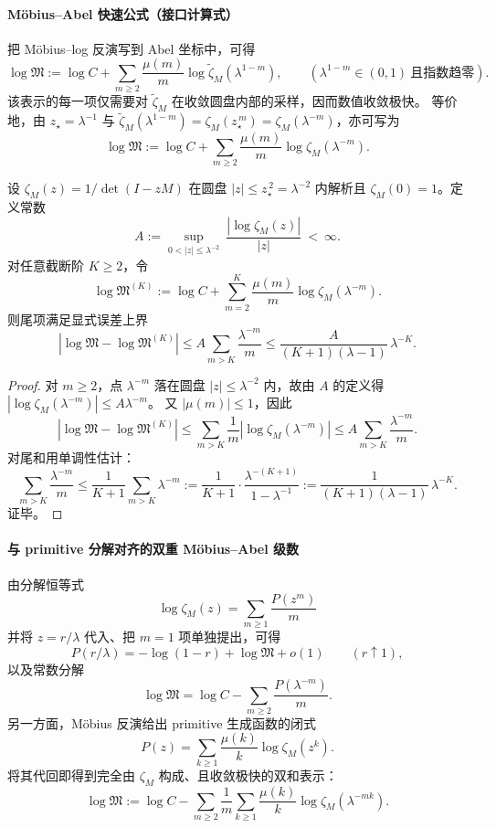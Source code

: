 \paragraph{Möbius--Abel 快速公式（接口计算式）}
把 Möbius--log 反演写到 Abel 坐标中，可得
\[
\log\mathfrak{M}
:=\log C+\sum_{m\ge 2}\frac{\mu(m)}{m}\log\widetilde{\zeta}_M(\lambda^{1-m}),
\qquad (\lambda^{1-m}\in(0,1)\ \text{且指数趋零}).
\]
该表示的每一项仅需要对 $\widetilde{\zeta}_M$ 在收敛圆盘内部的采样，因而数值收敛极快。
等价地，由 $z_\star=\lambda^{-1}$ 与 $\widetilde{\zeta}_M(\lambda^{1-m})=\zeta_M(z_\star^{\,m})=\zeta_M(\lambda^{-m})$，亦可写为
\[
\log\mathfrak{M}
:=\log C+\sum_{m\ge 2}\frac{\mu(m)}{m}\log\zeta_M(\lambda^{-m}).
\]

\begin{proposition}\label{prop:real-input-40-logM-trunc-bound}
设 $\zeta_M(z)=1/\det(I-zM)$ 在圆盘 $|z|\le z_\star^{\,2}=\lambda^{-2}$ 内解析且 $\zeta_M(0)=1$。定义常数
\[
A:=\sup_{0<|z|\le \lambda^{-2}}\ \frac{|\log\zeta_M(z)|}{|z|}\ <\ \infty.
\]
对任意截断阶 $K\ge 2$，令
\[
\log\mathfrak{M}^{(K)}:=\log C+\sum_{m=2}^{K}\frac{\mu(m)}{m}\log\zeta_M(\lambda^{-m}).
\]
则尾项满足显式误差上界
\[
\boxed{\;
|\log\mathfrak{M}-\log\mathfrak{M}^{(K)}|
\le
A\sum_{m>K}\frac{\lambda^{-m}}{m}
\le
\frac{A}{(K+1)(\lambda-1)}\,\lambda^{-K}.
\;}
\]
\end{proposition}
\begin{proof}
对 $m\ge 2$，点 $\lambda^{-m}$ 落在圆盘 $|z|\le\lambda^{-2}$ 内，故由 $A$ 的定义得
\(
|\log\zeta_M(\lambda^{-m})|\le A\lambda^{-m}
\)。
又 $|\mu(m)|\le 1$，因此
\[
|\log\mathfrak{M}-\log\mathfrak{M}^{(K)}|
\le \sum_{m>K}\frac{1}{m}|\log\zeta_M(\lambda^{-m})|
\le A\sum_{m>K}\frac{\lambda^{-m}}{m}.
\]
对尾和用单调性估计：
\[
\sum_{m>K}\frac{\lambda^{-m}}{m}
\le
\frac{1}{K+1}\sum_{m>K}\lambda^{-m}
:=\frac{1}{K+1}\cdot\frac{\lambda^{-(K+1)}}{1-\lambda^{-1}}
:=\frac{1}{(K+1)(\lambda-1)}\,\lambda^{-K}.
\]
证毕。
\end{proof}

\paragraph{与 primitive 分解对齐的双重 Möbius--Abel 级数}
由分解恒等式
\[
\log\zeta_M(z)=\sum_{m\ge 1}\frac{P(z^m)}{m}
\]
并将 $z=r/\lambda$ 代入、把 $m=1$ 项单独提出，可得
\[
P(r/\lambda)=-\log(1-r)+\log\mathfrak{M}+o(1)\qquad(r\uparrow 1),
\]
以及常数分解
\[
\log\mathfrak{M}=\log C-\sum_{m\ge 2}\frac{P(\lambda^{-m})}{m}.
\]
另一方面，Möbius 反演给出 primitive 生成函数的闭式
\[
P(z)=\sum_{k\ge 1}\frac{\mu(k)}{k}\log\zeta_M(z^k).
\]
将其代回即得到完全由 $\zeta_M$ 构成、且收敛极快的双和表示：
\[
\log\mathfrak{M}
:=\log C-\sum_{m\ge 2}\frac{1}{m}\sum_{k\ge 1}\frac{\mu(k)}{k}\log\zeta_M(\lambda^{-mk}).
\]

